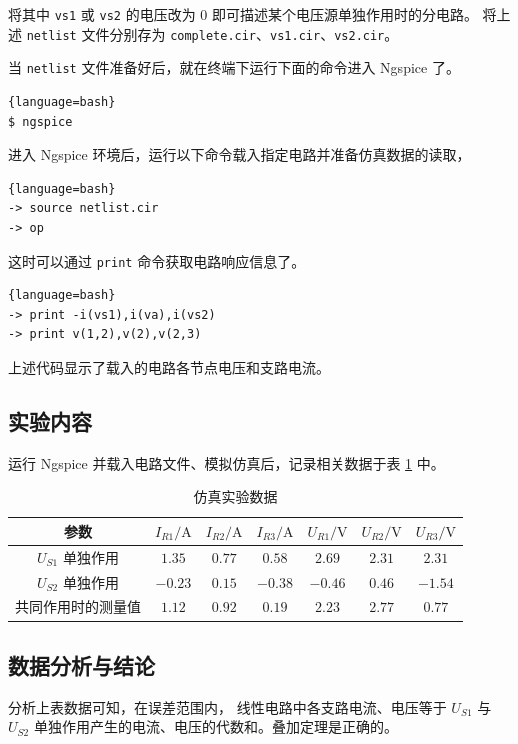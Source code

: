 \documentclass[UTF8,linespread=1.236]{ctexart}
\newcommand\pureunitA{\mathrm{A}}
\newcommand\pureunitV{\mathrm{V}}
\begin{document}
将其中 \verb|vs1| 或 \verb|vs2| 的电压改为 $0$ 即可描述某个电压源单独作用时的分电路。
将上述 \verb|netlist| 文件分别存为 \verb|complete.cir|、\verb|vs1.cir|、\verb|vs2.cir|。

当 \verb|netlist| 文件准备好后，就在终端下运行下面的命令进入 Ngspice 了。
\begin{lstlisting}{language=bash}
$ ngspice
\end{lstlisting}

进入 Ngspice 环境后，运行以下命令载入指定电路并准备仿真数据的读取，
\begin{lstlisting}{language=bash}
-> source netlist.cir
-> op
\end{lstlisting}

这时可以通过 \verb|print| 命令获取电路响应信息了。
\begin{lstlisting}{language=bash}
-> print -i(vs1),i(va),i(vs2)
-> print v(1,2),v(2),v(2,3)
\end{lstlisting}
上述代码显示了载入的电路各节点电压和支路电流。

\subsection{实验内容}

运行 Ngspice 并载入电路文件、模拟仿真后，记录相关数据于表 \ref{tab:expdata} 中。
\begin{table}[htb]
\centering
\begin{tabular}{ccccccc}
\toprule
参数 & $I_{R1}/\pureunitA$ & $I_{R2}/\pureunitA$ & $I_{R3}/\pureunitA$ & $U_{R1}/\pureunitV$ & $U_{R2}/\pureunitV$ & $U_{R3}/\pureunitV$ \\
\midrule
$U_{S1}$ 单独作用 & $1.35$ & $0.77$ & $0.58$ & $2.69$ & $2.31$ & $2.31$ \\
$U_{S2}$ 单独作用 & $-0.23$ & $0.15$ & $-0.38$ & $-0.46$ & $0.46$ & $-1.54$ \\
共同作用时的测量值 & $1.12$ & $0.92$ & $0.19$ & $2.23$ & $2.77$ & $0.77$ \\
\bottomrule
\end{tabular}
\caption{仿真实验数据}\label{tab:expdata}
\end{table}

\clearpage

\subsection{数据分析与结论}

分析上表数据可知，在误差范围内，
线性电路中各支路电流、电压等于 $U_{S1}$ 与 $U_{S2}$ 单独作用产生的电流、电压的代数和。叠加定理是正确的。
\end{document}
